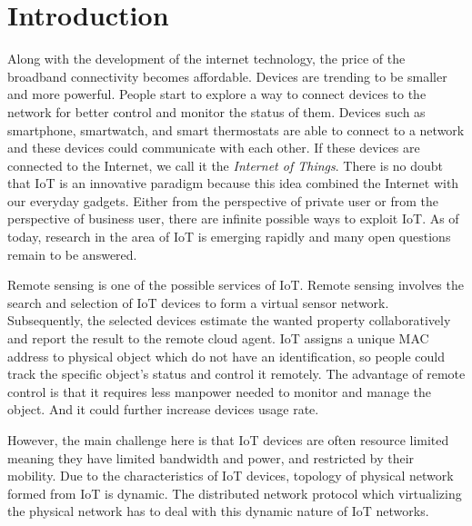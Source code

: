 \documentclass[journal]{IEEEtran}
\begin{document}
\section{Introduction}
% 
% 
% 
% 
\IEEEPARstart
{A}{long} with the development of the internet technology, the price of the broadband connectivity becomes affordable. Devices are trending to be  smaller and more powerful. People start to explore a way to connect devices to the network for better control and monitor the status of them. Devices such as smartphone, smartwatch, and smart thermostats are able to connect to a network and these devices could communicate with each other. If these devices are connected to the Internet, we call it the \textit{Internet of Things}. There is no doubt that IoT is an innovative paradigm \cite{Atzori} because this idea combined the Internet with our everyday gadgets. Either from the perspective of private user or from the perspective of business user, there are infinite possible ways to exploit IoT. As of today, research in the area of IoT is emerging rapidly and many open questions remain to be answered.

Remote sensing is one of the possible services of IoT. Remote sensing involves the search and selection of IoT devices to form a virtual sensor network. Subsequently, the selected devices estimate the wanted property collaboratively and report the result to the remote cloud agent. IoT assigns a unique MAC address to physical object which do not have an identification, so people could track the specific object’s status and control it remotely. The advantage of remote control is that it requires less manpower needed to monitor and manage the object. And it could further increase devices usage rate.

However, the main challenge here is that IoT devices are often resource limited meaning they have limited bandwidth and power, and restricted by their mobility. Due to the characteristics of IoT devices, topology of physical network formed from IoT is dynamic. The distributed network protocol which virtualizing the physical network has to deal with this dynamic nature of IoT networks.
\end{document}
